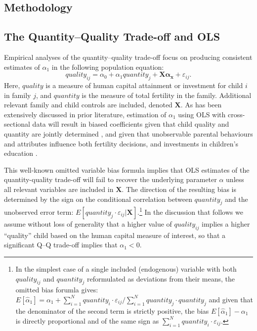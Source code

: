 \documentclass[subeqn]{article}
\begin{document}
\begin{spacing}{1.4}
\section{Methodology}
\label{TWINscn:method}
\subsection{The Quantity--Quality Trade-off and OLS}
\label{sscn:OLS}
Empirical analyses of the quantity--quality trade-off focus on producing
consistent estimates of $\alpha_1$ in the following population equation:
\begin{equation}
  \label{TWINeqn:RF}
  quality_{ij}=\alpha_0+\alpha_1 quantity_{j} + \bm{X}\bm{\alpha_x}+\varepsilon_{ij}.
\end{equation}
Here, $quality$ is a measure of human capital attainment or investment for child
$i$ in family $j$, and $quantity$ is the measure of total fertility in the
family. Additional relevant family and child controls are included, denoted $\bm{X}$.
As has been extensively discussed in prior literature, estimation of $\alpha_1$
using OLS with cross-sectional data will result in biased coefficients given that
child quality and quantity are jointly determined \citep{BeckerLewis1973,
  BeckerTomes1976}, and given that unobservable parental behaviours and attributes
influence both fertility decisions, and investments in children's education
\citep{Qian2009}.

This well-known omitted variable bias formula implies that OLS estimates of
the quantity-quality trade-off will fail to recover the underlying parameter
$\alpha$ unless all relevant variables are included in $\bm{X}$. The direction
of the resulting bias is determined by the sign on the conditional correlation
between $quantity_j$ and the unobserved error term:
$E[quantity_{j}\cdot\varepsilon_{ij}|\bm{X}]$.\footnote{In the simplest case
  of a single included (endogenous) variable with both $quality_{ij}$ and
  $quantity_j$ reformulated as deviations from their means, the omitted bias
  forumla gives:
  $
  E[\hat\alpha_1]=\alpha_1+\sum_{i=1}^N quantity_i\cdot\varepsilon_{ij}/\sum_{i=1}^N quantity_j\cdot quantity_j
  $
  and given that the denominator of the second term is strictly positive, the
  bias $E[\hat\alpha_1]-\alpha_1$ is directly proportional and of the same
  sign as $\sum_{i=1}^N quantity_i\cdot\varepsilon_{ij}$.
}
In the discussion that follows we assume without loss of generality that a higher
value of $quality_{ij}$ implies a higher ``quality'' child based on the human capital
measure of interest, so that a significant Q--Q trade-off implies that $\alpha_1<0$.


\end{spacing}
\end{document}
